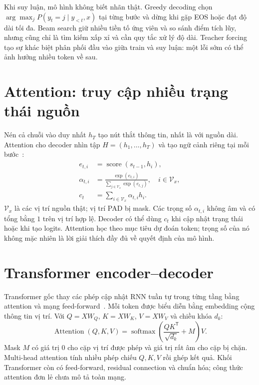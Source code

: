 \documentclass[12pt,a4paper]{article}
\begin{document}
Khi suy luận, mô hình không biết nhãn thật. Greedy decoding chọn $\arg\max_j P(y_t=j\mid y_{<t},x)$ tại từng bước và dừng khi gặp EOS hoặc đạt độ dài tối đa. Beam search giữ nhiều tiền tố ứng viên và so sánh điểm tích lũy, nhưng cũng chỉ là tìm kiếm xấp xỉ và cần quy tắc xử lý độ dài. Teacher forcing tạo sự khác biệt phân phối đầu vào giữa train và suy luận: một lỗi sớm có thể ảnh hưởng nhiều token về sau.

\section{Attention: truy cập nhiều trạng thái nguồn}
Nén cả chuỗi vào duy nhất $h_T$ tạo nút thắt thông tin, nhất là với nguồn dài. Attention cho decoder nhìn tập $H=(h_1,\ldots,h_T)$ và tạo ngữ cảnh riêng tại mỗi bước~\cite{bahdanau2014}:
\begin{align}
e_{t,i}&=\operatorname{score}(s_{t-1},h_i),\\
\alpha_{t,i}&=\frac{\exp(e_{t,i})}{\sum_{j\in\mathcal V_x}\exp(e_{t,j})},\quad i\in\mathcal V_x,\\
c_t&=\sum_{i\in\mathcal V_x}\alpha_{t,i}h_i.
\end{align}
$\mathcal V_x$ là các vị trí nguồn thật; vị trí PAD bị mask. Các trọng số $\alpha_{t,i}$ không âm và có tổng bằng $1$ trên vị trí hợp lệ. Decoder có thể dùng $c_t$ khi cập nhật trạng thái hoặc khi tạo logits. Attention học theo mục tiêu dự đoán token; trọng số của nó không mặc nhiên là lời giải thích đầy đủ về quyết định của mô hình.

\section{Transformer encoder--decoder}
Transformer gốc thay các phép cập nhật RNN tuần tự trong từng tầng bằng attention và mạng feed-forward~\cite{vaswani2017}. Mỗi token được biểu diễn bằng embedding cộng thông tin vị trí. Với $Q=XW_Q$, $K=XW_K$, $V=XW_V$ và chiều khóa $d_k$:
\begin{equation}
\operatorname{Attention}(Q,K,V)=\operatorname{softmax}\!\left(\frac{QK^{\mathsf T}}{\sqrt{d_k}}+M\right)V.
\end{equation}
Mask $M$ có giá trị $0$ cho cặp vị trí được phép và giá trị rất âm cho cặp bị chặn. Multi-head attention tính nhiều phép chiếu $Q,K,V$ rồi ghép kết quả. Khối Transformer còn có feed-forward, residual connection và chuẩn hóa; công thức attention đơn lẻ chưa mô tả toàn mạng.
\end{document}
